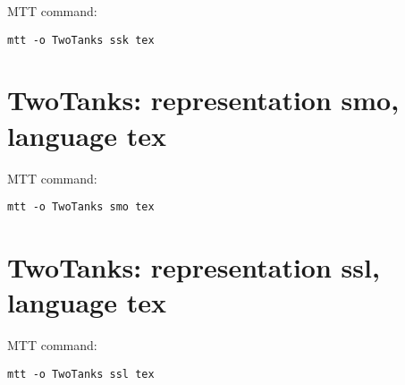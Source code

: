 MTT command:
\begin{verbatim}
mtt -o TwoTanks ssk tex 
\end{verbatim}
  


\section{\textbf{TwoTanks}: representation \textbf{smo}, language \textbf{tex}}
\label{sec:TwoTanks_smo.tex}


MTT command:
\begin{verbatim}
mtt -o TwoTanks smo tex 
\end{verbatim}
  


\section{\textbf{TwoTanks}: representation \textbf{ssl}, language \textbf{tex}}
\label{sec:TwoTanks_ssl.tex}


MTT command:
\begin{verbatim}
mtt -o TwoTanks ssl tex 
\end{verbatim}
  
